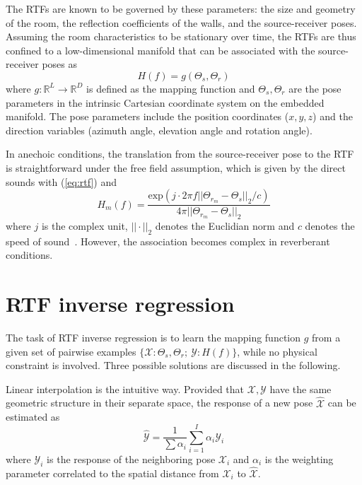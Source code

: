 \documentclass[journal]{IEEEtran}
\begin{document}
The RTFs are known to be governed by these parameters: the size and geometry of the room, the reflection coefficients of the walls, and the source-receiver poses. Assuming the room characteristics to be stationary over time, the RTFs are thus confined to a low-dimensional manifold that can be associated with the source-receiver poses as
\begin{equation}\label{eq:rtfpose}
    H(f) = g(\Theta_s,\Theta_r)
\end{equation}
where $g:\mathbb{R}^{L}\rightarrow \mathbb{R}^{D}$ is defined as the mapping function and $\Theta_s,\Theta_r$ are the pose parameters in the intrinsic Cartesian coordinate system on the embedded manifold. The pose parameters include the position coordinates ($x, y, z$) and the direction variables (azimuth angle, elevation angle and rotation angle).

In anechoic conditions, the translation from the source-receiver pose to the RTF is straightforward under the free field assumption, which is given by the direct sounds with (\ref{eq:rtf}) and
\begin{equation}\label{eq:green}
  H_m(f)=\frac{\text{exp}(j\cdot 2\pi f ||\Theta_{r_m} - \Theta_s||_2 / c)}{4\pi ||\Theta_{r_m} - \Theta_s||_2}
\end{equation}
where $j$ is the complex unit, $||\cdot||_2$ denotes the Euclidian norm and $c$ denotes the speed of sound~\cite{samarasinghe2015efficient}. However, the association becomes complex in reverberant conditions.

\section{RTF inverse regression}

The task of RTF inverse regression is to learn the mapping function $g$ from a given set of pairwise examples $\{\mathcal{X}:\Theta_s,\Theta_r;~\mathcal{Y}:H(f)\}$, while no physical constraint is involved. Three possible solutions are discussed in the following.

Linear interpolation is the intuitive way. Provided that $\mathcal{X},\mathcal{Y}$ have the same geometric structure in their separate space, the response of a new pose $\widehat{\mathcal{X}}$ can be estimated as
\begin{equation}\label{eq:linearinter}
  \widehat{\mathcal{Y}}=\frac{1}{\sum \alpha_i}\sum_{i=1}^{I}\alpha_i \mathcal{Y}_i
\end{equation}
where $\mathcal{Y}_i$ is the response of the neighboring pose $\mathcal{X}_i$ and $\alpha_i$ is the weighting parameter correlated to the spatial distance from $\mathcal{X}_i$ to $\widehat{\mathcal{X}}$.
\end{document}
